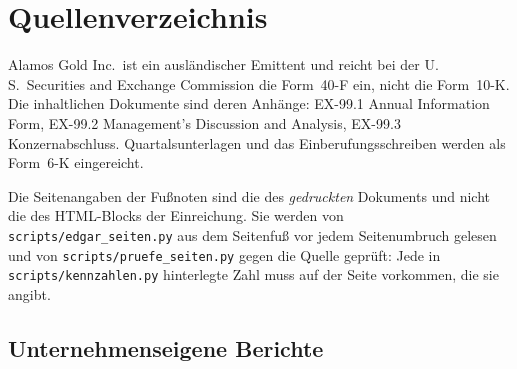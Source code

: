 \section*{Quellenverzeichnis}

Alamos Gold Inc.\ ist ein ausl\"andischer Emittent und reicht bei der
U.\,S.\ Securities and Exchange Commission die Form~40-F ein, nicht die
Form~10-K. Die inhaltlichen Dokumente sind deren Anh\"ange: EX-99.1 Annual
Information Form, EX-99.2 Management's Discussion and Analysis, EX-99.3
Konzernabschluss. Quartalsunterlagen und das Einberufungsschreiben werden als
Form~6-K eingereicht.

Die Seitenangaben der Fu{\ss}noten sind die des \emph{gedruckten} Dokuments
und nicht die des HTML-Blocks der Einreichung. Sie werden von
\texttt{scripts/edgar\_seiten.py} aus dem Seitenfu{\ss} vor jedem
Seitenumbruch gelesen und von \texttt{scripts/pruefe\_seiten.py} gegen die
Quelle gepr\"uft: Jede in \texttt{scripts/kennzahlen.py} hinterlegte Zahl
muss auf der Seite vorkommen, die sie angibt.

\subsection*{Unternehmenseigene Berichte}

